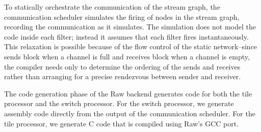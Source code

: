To statically orchestrate the communication of the stream graph, the
communication scheduler simulates the firing of nodes in the stream
graph, recording the communication as it simulates.  The simulation
does not model the code inside each filter; instead it assumes that
each filter fires instantaneously.  This relaxation is possible
because of the flow control of the static network--since sends block
when a channel is full and receives block when a channel is empty, the
compiler needs only to determine the ordering of the sends and
receives rather than arranging for a precise rendezvous between sender
and receiver.

The code generation phase of the Raw backend generates code for both
the tile processor and the switch processor.  For the switch
processor, we generate assembly code directly from the output of the
communication scheduler.  For the tile
processor, we generate C code that is compiled using Raw's GCC port.

